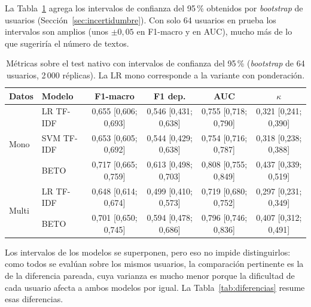 \documentclass[12pt,a4paper]{article}
\begin{document}
La Tabla~\ref{tab:leaderboard_ic} agrega los intervalos de confianza del 95\,\% obtenidos por \emph{bootstrap} de usuarios (Sección~\ref{sec:incertidumbre}). Con solo 64 usuarios en prueba los intervalos son amplios (unos $\pm 0{,}05$ en F1-macro y en AUC), mucho más de lo que sugeriría el número de textos.

\begin{table}[H]
\centering
\footnotesize
\setlength{\tabcolsep}{4pt}
\caption{Métricas sobre el test nativo con intervalos de confianza del 95\,\% (\emph{bootstrap} de 64 usuarios, 2\,000 réplicas). La LR mono corresponde a la variante con ponderación.}
\label{tab:leaderboard_ic}
\begin{tabular}{llcccc}
\toprule
\textbf{Datos} & \textbf{Modelo} & \textbf{F1-macro} & \textbf{F1 dep.} & \textbf{AUC} & \textbf{$\kappa$} \\
\midrule
\multirow{3}{*}{Mono}
 & LR TF-IDF               & 0{,}655 {\scriptsize [0{,}606; 0{,}693]} & 0{,}546 {\scriptsize [0{,}431; 0{,}638]} & 0{,}755 {\scriptsize [0{,}718; 0{,}790]} & 0{,}321 {\scriptsize [0{,}241; 0{,}390]} \\
 & SVM TF-IDF              & 0{,}653 {\scriptsize [0{,}605; 0{,}692]} & 0{,}544 {\scriptsize [0{,}429; 0{,}638]} & 0{,}754 {\scriptsize [0{,}716; 0{,}787]} & 0{,}318 {\scriptsize [0{,}238; 0{,}388]} \\
 & BETO                    & 0{,}717 {\scriptsize [0{,}665; 0{,}759]} & 0{,}613 {\scriptsize [0{,}498; 0{,}703]} & 0{,}808 {\scriptsize [0{,}755; 0{,}849]} & 0{,}437 {\scriptsize [0{,}339; 0{,}519]} \\
\midrule
\multirow{2}{*}{Multi}
 & LR TF-IDF               & 0{,}648 {\scriptsize [0{,}614; 0{,}674]} & 0{,}499 {\scriptsize [0{,}410; 0{,}573]} & 0{,}719 {\scriptsize [0{,}680; 0{,}752]} & 0{,}297 {\scriptsize [0{,}231; 0{,}349]} \\
 & BETO                    & 0{,}701 {\scriptsize [0{,}650; 0{,}745]} & 0{,}594 {\scriptsize [0{,}478; 0{,}686]} & 0{,}796 {\scriptsize [0{,}746; 0{,}836]} & 0{,}407 {\scriptsize [0{,}312; 0{,}491]} \\
\bottomrule
\end{tabular}
\end{table}

Los intervalos de los modelos se superponen, pero eso no impide distinguirlos: como todos se evalúan sobre los mismos usuarios, la comparación pertinente es la de la diferencia pareada, cuya varianza es mucho menor porque la dificultad de cada usuario afecta a ambos modelos por igual. La Tabla~\ref{tab:diferencias} resume esas diferencias.
\end{document}
